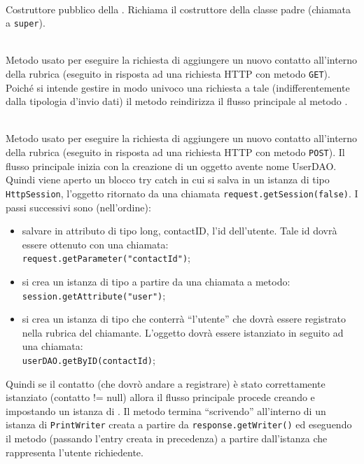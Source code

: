 \begin{description}
	\item{}\\
	Costruttore pubblico della . Richiama il costruttore della classe padre (chiamata a \texttt{super}).
	
	\item{}\\
	Metodo usato per eseguire la richiesta di aggiungere un nuovo contatto all'interno della rubrica (eseguito in risposta ad una richiesta HTTP con metodo \texttt{GET}). Poiché si intende gestire in modo univoco una richiesta a tale  (indifferentemente dalla tipologia d'invio dati) il metodo reindirizza il flusso principale al metodo .
	
	\item{}\\	
	Metodo usato per eseguire la richiesta di aggiungere un nuovo contatto all'interno della rubrica (eseguito in risposta ad una richiesta HTTP con metodo \texttt{POST}). Il flusso principale inizia  con la creazione di un oggetto  avente nome UserDAO. Quindi viene aperto un blocco try catch in cui si salva in un istanza di tipo \texttt{HttpSession}, l'oggetto ritornato da una chiamata \verb|request.getSession(false)|. I passi successivi sono (nell'ordine):
	\begin{itemize}
		\item salvare in attributo di tipo long, contactID, l'id dell'utente. Tale id dovrà essere ottenuto con una chiamata:\\
		\verb|request.getParameter("contactId")|;\\
		
		\item si crea un istanza di tipo  a partire da una chiamata a metodo:\\
		\verb|session.getAttribute("user")|;
		
		\item si crea un istanza di tipo  che conterrà ``l'utente'' che dovrà essere registrato nella rubrica del chiamante. L'oggetto dovrà essere istanziato in seguito ad una chiamata:\\
		\verb|userDAO.getByID(contactId)|;
	\end{itemize}
	Quindi se il contatto (che dovrò andare a registrare) è stato correttamente istanziato (contatto != null) allora il flusso principale procede creando e impostando un istanza di . Il metodo termina ``scrivendo''  all'interno di un istanza di \texttt{PrintWriter} creata a partire da \texttt{response.getWriter()} ed eseguendo il metodo  (passando l'entry creata in precedenza) a partire dall'istanza che rappresenta l'utente richiedente.
	

\end{description}

